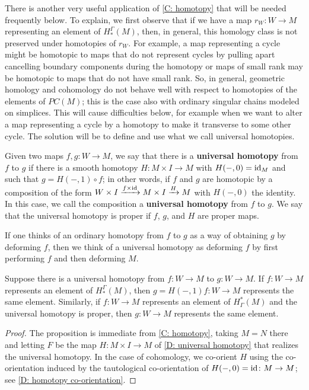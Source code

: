 There is another very useful application of \cref{C: homotopy} that will be needed frequently below.
To explain, we first observe that if we have a map $r_W \colon W \to M$ representing an element of $H_*^\Gamma(M)$, then, in general, this homology class is not preserved under homotopies of $r_W$.
For example, a map representing a cycle might be homotopic to maps that do not represent cycles by pulling apart cancelling boundary components during the homotopy or maps of small rank may be homotopic to maps that do not have small rank.
So, in general, geometric homology and cohomology do not behave well with respect to homotopies of the elements of $PC(M)$; this is the case also with ordinary singular chains modeled on simplices.
This will cause difficulties below, for example when we want to alter a map representing a cycle by a homotopy to make it transverse to some other cycle.
The solution will be to define and use what we call universal homotopies.

\begin{definition}\label{D: universal homotopy}
	Given two maps $f,g \colon W\to M$, we say that there is a \textbf{universal homotopy} from $f$ to $g$ if there is a smooth homotopy $H \colon M\times I\to M$ with $H(-,0)=\mathrm{id}_M$ and such that $g=H(-,1)\circ f$; in other words, if $f$ and $g$ are homotopic by a composition of the form $W \times I \xrightarrow{f\times \mathrm{id}} M \times I \xrightarrow{H} M$ with $H(-,0)$ the identity. In this case, we call the composition a \textbf{universal homotopy} from $f$ to $g$. We say that the universal homotopy is proper if $f$, $g$, and $H$ are proper maps.
\end{definition}

If one thinks of an ordinary homotopy from $f$ to $g$ as a way of obtaining $g$ by deforming $f$, then we think of a universal homotopy as deforming $f$ by first performing $f$ and then deforming $M$.


\begin{proposition}\label{P: universal homotopy}
	Suppose there is a universal homotopy from $f \colon W\to M$ to $g \colon W\to M$. If $f \colon W\to M$ represents an element of $H_*^\Gamma(M)$, then $g = H(-,1)f \colon W\to M$ represents the same element. Similarly, if $f \colon W\to M$ represents an element of $H^*_\Gamma(M)$ and the universal homotopy is proper, then $g \colon W\to M$ represents the same element.
\end{proposition}

\begin{proof}
	The proposition is immediate from \cref{C: homotopy}, taking $M=N$ there and letting $F$ be the map $H \colon M \times I \to M$ of \cref {D: universal homotopy} that realizes the universal homotopy. In the case of cohomology, we co-orient $H$ using the co-orientation induced by the tautological co-orientation of $H(-,0) = \mathrm{id} \colon M \to M$; see \cref{D: homotopy co-orientation}.
\end{proof}

